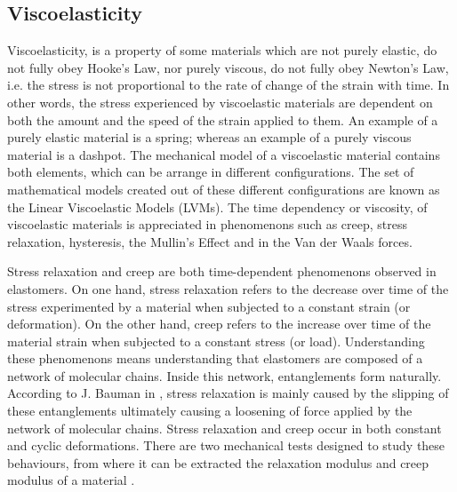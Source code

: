 \subsection{Viscoelasticity}

Viscoelasticity, is a property of some materials which are not purely elastic, do not fully obey Hooke's Law, nor purely viscous, do not fully obey Newton's Law, i.e. the stress is not proportional to the rate of change of the strain with time. In other words, the stress experienced by viscoelastic materials are dependent on both the amount and the speed of the strain applied to them. An example of a purely elastic material is a spring; whereas an example of a purely viscous material is a dashpot. The mechanical model of a viscoelastic material contains both elements, which can be arrange in different configurations. The set of mathematical models created out of these different configurations are known as the Linear Viscoelastic Models (LVMs). The time dependency or viscosity, of viscoelastic materials is appreciated in phenomenons such as creep, stress relaxation, hysteresis, the Mullin's Effect and in the Van der Waals forces.

Stress relaxation and creep are both time-dependent phenomenons observed in elastomers. On one hand, stress relaxation refers to the decrease over time of the stress experimented by a material when subjected to a constant strain (or deformation). On the other hand, creep refers to the increase over time of the material strain when subjected to a constant stress (or load). Understanding these phenomenons means understanding that elastomers are composed of a network of molecular chains. Inside this network, entanglements form naturally. According to J. Bauman in \cite{Bauman2008}, stress relaxation is mainly caused by the slipping of these entanglements ultimately causing a loosening of force applied by the network of molecular chains. Stress relaxation and creep occur in both constant and cyclic deformations. There are two mechanical tests designed to study these behaviours, from where it can be extracted the relaxation modulus and creep modulus of a material \cite{oberg2016}. 

